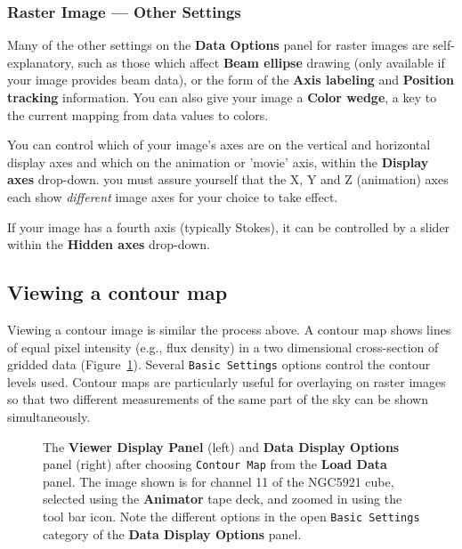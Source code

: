 \subsubsection{Raster Image --- Other Settings}
\label{section:display.image.raster.adjust.other}

Many of the other settings on the {\bf Data Options} panel for raster images
are self-explanatory, such as those which affect {\bf Beam ellipse} drawing
(only available if your image provides beam data), or the form of the
{\bf Axis labeling} and {\bf Position tracking} information.  You can also
give your image a {\bf Color wedge}, a key to the current mapping from data
values to colors.

You can control which of your image's axes are on the vertical and horizontal
display axes and which on the animation or 'movie' axis, within the
{\bf Display axes} drop-down.  you must assure yourself that the X, Y
and Z (animation) axes each show {\it different} image axes for your choice
to take effect.

If your image has a fourth axis (typically Stokes), it can be controlled
by a slider within the {\bf Hidden axes} drop-down.



\subsection{Viewing a contour map}
\label{section:display.image.contour}

Viewing a contour image is similar the process above. A contour map
shows lines of equal pixel intensity (e.g., flux density) in a two
dimensional cross-section of gridded data (Figure~\ref{fig:viewer_con}).
Several {\tt Basic Settings} options control the contour levels used.
Contour maps are particularly useful for overlaying on raster images so
that two different measurements of the same part of the sky can be shown
simultaneously.

 
\begin{figure}[h!]
\caption{\label{fig:viewer_con} The {\bf Viewer Display Panel}
(left) and {\bf Data Display Options} panel (right) after choosing
{\tt Contour Map} from the {\bf Load Data} panel.  The
image shown is for channel 11 of the NGC5921 cube, selected using
the {\bf Animator} tape deck, and zoomed in using the tool bar icon.
Note the different options in the open {\tt Basic Settings} category
of the {\bf Data Display Options} panel.} 
\hrulefill
\end{figure}

